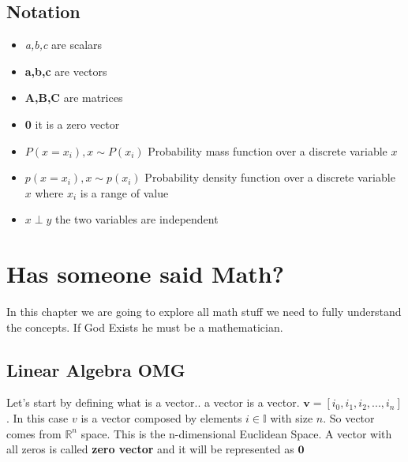 \documentclass[12pt,a4paper,twoside,openright]{scrbook}
\begin{document}
\section{Notation}
\begin{itemize}
\item \textit{a,b,c} are scalars
\item \textbf{a,b,c} are vectors
\item \textbf{A,B,C} are matrices
\item \textbf{0} it is a zero vector
\item $P(x=x_i), x \sim P(x_i)$ Probability mass function over a discrete variable $x$
\item $p(x=x_i), x \sim p(x_i)$ Probability density function over a discrete variable $x$ where $x_i$ is a range of value
\item $x \perp y$ the two variables are independent
\end{itemize}

\chapter{Has someone said Math?}

In this chapter we are going to explore all math stuff we need to fully understand the concepts.
If God Exists he must be a mathematician.

\section{Linear Algebra OMG}

Let's start by defining what is a vector.. a vector is a vector. $\textbf{v} = [i_0, i_1, i_2, ... , i_n]$. In this case $v$ is a vector composed by elements $i \in \mathbb{I}$ with size $n$. So vector comes from $\mathbb{R}^n$ space. This is the n-dimensional Euclidean Space. A vector with all zeros is called \textbf{zero vector} and it will be represented as $\textbf{0}$
\end{document}
